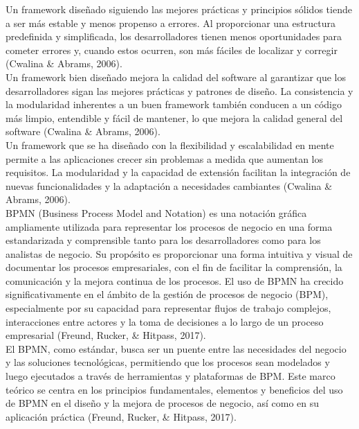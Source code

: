 \documentclass[12pt,letterpaper,spanish, xcolor=table]{report}
\numberwithin{figure}{subsection}
\begin{document}
Un framework diseñado siguiendo las mejores prácticas y 
principios sólidos tiende a ser más estable y menos propenso a errores. Al 
proporcionar una estructura predefinida y simplificada, los desarrolladores tienen menos oportunidades para cometer errores y, cuando estos ocurren, son más fáciles de localizar y corregir (Cwalina \& Abrams, 2006).\\

Un framework bien diseñado mejora la calidad del software al garantizar que los desarrolladores sigan las mejores prácticas y patrones de diseño. La consistencia y la modularidad inherentes a un buen framework también conducen a un código más limpio, entendible y fácil de mantener, lo que mejora la calidad general del software (Cwalina \& Abrams, 2006).\\

Un framework que se ha diseñado con la flexibilidad y 
escalabilidad en mente permite a las aplicaciones crecer sin problemas a medida que aumentan los requisitos. La modularidad y la capacidad de extensión facilitan la integración de nuevas funcionalidades y la adaptación a necesidades cambiantes (Cwalina \& Abrams, 2006).\\

BPMN (Business Process Model and Notation) es una notación gráfica ampliamente utilizada para representar los procesos de negocio en una forma estandarizada y comprensible tanto para los desarrolladores como para los analistas de negocio. Su propósito es proporcionar una forma intuitiva y visual de documentar los procesos empresariales, con el fin de facilitar la comprensión, la comunicación y la mejora continua de los procesos. El uso de BPMN ha crecido significativamente en el ámbito de la gestión de procesos de negocio (BPM), especialmente por su capacidad para representar flujos de trabajo complejos, interacciones entre actores y la toma de decisiones a lo largo de un proceso empresarial (Freund, Rucker, \& Hitpass, 2017).\\

El BPMN, como estándar, busca ser un puente entre las necesidades del negocio y las soluciones tecnológicas, permitiendo que los procesos sean modelados y luego ejecutados a través de herramientas y plataformas de BPM. Este marco teórico se centra en los principios fundamentales, elementos y beneficios del uso de BPMN en el diseño y la mejora de procesos de negocio, así como en su aplicación práctica (Freund, Rucker, \& Hitpass, 2017).\\
\end{document}
